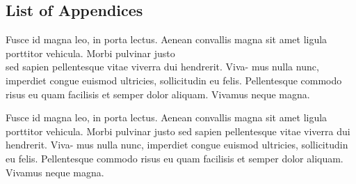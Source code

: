 
\newpage \begin{appendices} 
\appendixtocon %
\renewcommand*\appendixpagename{\Large Appendices}
\appendixpage %

\subsection*{List of Appendices}
\listofappendices

\begin{subappendices}
\renewcommand{\setthesubsection}{\arabic{subsection}:}%


Fusce id magna leo, in porta lectus. Aenean convallis magna sit amet ligula
porttitor vehicula. Morbi pulvinar justo\\
sed sapien pellentesque vitae viverra dui hendrerit. Viva- mus nulla nunc,
imperdiet congue euismod ultricies, sollicitudin eu felis. Pellentesque commodo
risus eu quam facilisis et semper dolor aliquam. Vivamus neque magna.

\newpage
{}
Fusce id magna leo, in porta lectus. Aenean convallis magna sit amet ligula
porttitor vehicula. Morbi pulvinar justo sed sapien pellentesque vitae viverra
dui hendrerit. Viva- mus nulla nunc, imperdiet congue euismod ultricies,
sollicitudin eu felis. Pellentesque commodo risus eu quam facilisis et semper
dolor aliquam. Vivamus neque magna.


\end{subappendices}
\end{appendices}

